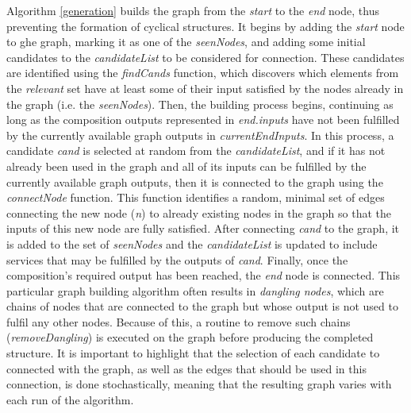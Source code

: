 \documentclass{article}
\begin{document}
Algorithm \ref{generation} builds the graph from the \textit{start} to the \textit{end} node, thus preventing the formation of cyclical
structures. It begins by adding the \textit{start} node to ghe graph, marking it as one of the
\textit{seenNodes}, and adding some initial candidates to the \textit{candidateList} to be considered for connection. These candidates
are identified using the \textit{findCands} function, which discovers which elements from the \textit{relevant} set have at least some
of their input satisfied by the nodes already in the graph (i.e. the \textit{seenNodes}). Then, the building process begins, continuing
as long as the composition outputs represented in \textit{end.inputs} have not been fulfilled by the currently available graph outputs
in \textit{currentEndInputs}. In this process, a candidate \textit{cand} is selected at random from the \textit{candidateList}, and if
it has not already been used in the graph and all of its inputs can be fulfilled by the currently available graph outputs, then it is
connected to the graph using the \textit{connectNode} function. This function identifies a random, minimal set of edges connecting the
new node (\textit{n}) to already existing nodes in the graph so that the inputs of this new node are fully satisfied. After connecting
\textit{cand} to the graph, it is added to the set of \textit{seenNodes} and the \textit{candidateList} is updated to include services
that may be fulfilled by the outputs of \textit{cand}. Finally, once the composition's required output has been reached, the \textit{end}
node is connected. This particular graph building algorithm often results in \textit{dangling nodes}, which are chains of nodes that are
connected to the graph but whose output is not used to fulfil any other nodes. Because of this, a routine to remove such chains (\textit{removeDangling})
is executed on the graph before producing the completed structure. It is important to highlight that the selection of each candidate
to connected with the graph, as well as the edges that should be used in this connection, is done stochastically, meaning that the
resulting graph varies with each run of the algorithm.
\end{document}
